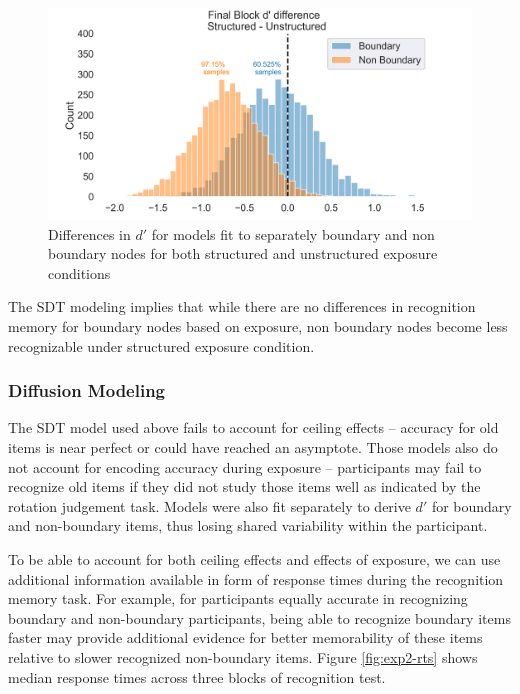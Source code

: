 \begin{figure}
    \centering
    \includegraphics[width = \textwidth]{chapter_notebooks/chapter_3/figures/sdt_d_results.png}
    \caption{Differences in $d'$ for models fit to separately boundary and non boundary nodes for both structured and unstructured exposure conditions}
    \label{fig:sdt-params}
\end{figure}

The SDT modeling implies that while there are no differences in recognition memory for boundary nodes based on exposure, non boundary nodes become less recognizable under structured exposure condition. 

\subsubsection*{Diffusion Modeling}
The SDT model used above fails to account for ceiling effects -- accuracy for old items is near perfect or could have reached an asymptote. Those models also do not account for encoding accuracy during exposure -- participants may fail to recognize old items if they did not study those items well as indicated by the rotation judgement task. Models were also fit separately to derive $d'$ for boundary and non-boundary items, thus losing shared variability within the participant.

To be able to account for both ceiling effects and effects of exposure, we can use additional information available in form of response times during the recognition memory task. For example, for participants equally accurate in recognizing boundary and non-boundary participants, being able to recognize boundary items faster may provide additional evidence for better memorability of these items relative to slower recognized non-boundary items. Figure \ref{fig:exp2-rts} shows median response times across three blocks of recognition test. 

